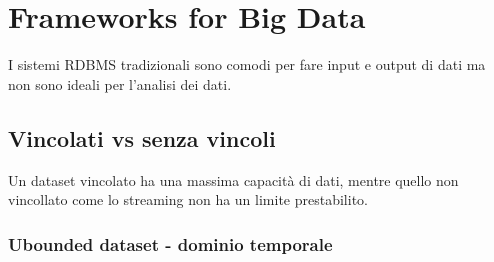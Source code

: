 \section{Frameworks for Big Data}

I sistemi RDBMS tradizionali sono comodi per fare input e output di dati
ma non sono ideali per l'analisi dei dati.

\subsection{Vincolati vs senza vincoli}
Un dataset vincolato ha una massima capacità di dati, mentre
quello non vincollato come lo streaming non ha un limite prestabilito.

\subsubsection{Ubounded dataset - dominio temporale}














































